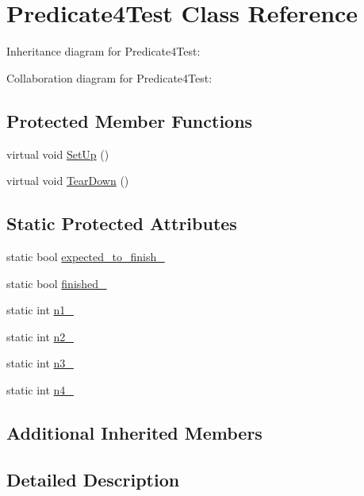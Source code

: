 \hypertarget{class_predicate4_test}{}\section{Predicate4\+Test Class Reference}
\label{class_predicate4_test}


Inheritance diagram for Predicate4\+Test\+:


Collaboration diagram for Predicate4\+Test\+:
\subsection*{Protected Member Functions}
\begin{DoxyCompactItemize}
\item 
virtual void \hyperlink{class_predicate4_test_afcf9db5dc68e97291813cdfeb2aaa5d2}{Set\+Up} ()
\item 
virtual void \hyperlink{class_predicate4_test_ab61983a4cdf3657b02bc2b81b67729c4}{Tear\+Down} ()
\end{DoxyCompactItemize}
\subsection*{Static Protected Attributes}
\begin{DoxyCompactItemize}
\item 
static bool \hyperlink{class_predicate4_test_a20600b5eda187c42ce4e812e77269654}{expected\+\_\+to\+\_\+finish\+\_\+}
\item 
static bool \hyperlink{class_predicate4_test_acfd174bf9dfb5a91afbcdca17e797888}{finished\+\_\+}
\item 
static int \hyperlink{class_predicate4_test_a8eb30cd283e613f7a2e501a3969be9ae}{n1\+\_\+}
\item 
static int \hyperlink{class_predicate4_test_a088fce743c747e3851c926cb3a87fda3}{n2\+\_\+}
\item 
static int \hyperlink{class_predicate4_test_a00ae6ae54c7d6639d448c036aedb6114}{n3\+\_\+}
\item 
static int \hyperlink{class_predicate4_test_ae42e23ce11e3f1c6b813496d6180cc67}{n4\+\_\+}
\end{DoxyCompactItemize}
\subsection*{Additional Inherited Members}


\subsection{Detailed Description}


